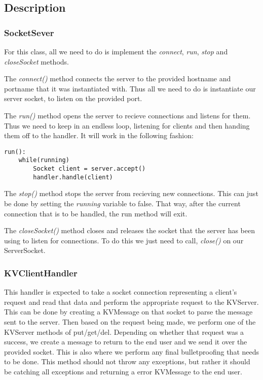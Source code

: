\documentclass{article}
\begin{document}
\subsection*{Description}

\subsubsection*{SocketSever}
For this class, all we need to do is implement the \textit{connect}, \textit{run}, \textit{stop} and
\textit{closeSocket} methods. 

The \textit{connect()} method connects the server to the provided hostname and portname that it was instantiated with.
Thus all we need to do is instantiate our server socket, to listen on the provided port.

The \textit{run()} method opens the server to recieve connections and listens for them. Thus we need to keep
in an endless loop, listening for clients and then handing them off to the handler. It will work in the following
fashion:
\begin{verbatim}
run():
    while(running)
        Socket client = server.accept()
        handler.handle(client)
\end{verbatim}

The \textit{stop()} method stops the server from recieving new connections. This can just be done by setting the
\textit{running} variable to false. That way, after the current connection that is to be handled, the run method will
exit.

The \textit{closeSocket()} method closes and releases the socket that the server has been using to listen for
connections. To do this we just need to call, \textit{close()} on our ServerSocket.

\subsubsection*{KVClientHandler}

This handler is expected to take a socket connection representing a client's request and read that data and
perform the appropriate request to the KVServer. This can be done by creating a KVMessage on that socket to parse the
message sent to the server. Then based on the request being made, we perform one of the KVServer methods of put/get/del.
Depending on whether that request was a success, we create a message to return to the end user and we send it over the
provided socket. This is also where we perform any final bulletproofing that needs to be done. This method should not
throw any exceptions, but rather it should be catching all exceptions and returning a error KVMessage to the end user.
\end{document}
